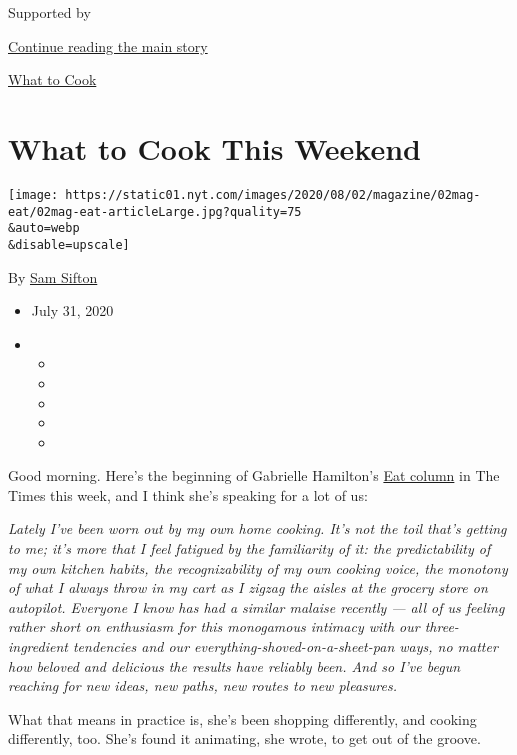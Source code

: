 Supported by

\protect\hyperlink{after-sponsor}{Continue reading the main story}

\href{/column/what-to-cook}{What to Cook}

\hypertarget{what-to-cook-this-weekend}{%
\section{What to Cook This Weekend}\label{what-to-cook-this-weekend}}

\texttt{[image: https://static01.nyt.com/images/2020/08/02/magazine/02mag-eat/02mag-eat-articleLarge.jpg?quality=75\\\&auto=webp\\\&disable=upscale]}

By \href{https://www.nytimes.com/by/sam-sifton}{Sam Sifton}

\begin{itemize}
\item
  July 31, 2020
\item
  \begin{itemize}
  \item
  \item
  \item
  \item
  \item
  \end{itemize}
\end{itemize}

Good morning. Here's the beginning of Gabrielle Hamilton's
\href{https://www.nytimes.com/2020/07/29/magazine/bored-with-your-home-cooking-some-smoky-eggplant-will-fix-that.html}{Eat
column} in The Times this week, and I think she's speaking for a lot of
us:

\emph{Lately I've been worn out by my own home cooking. It's not the
toil that's getting to me; it's more that I feel fatigued by the
familiarity of it: the predictability of my own kitchen habits, the
recognizability of my own cooking voice, the monotony of what I always
throw in my cart as I zigzag the aisles at the grocery store on
autopilot. Everyone I know has had a similar malaise recently --- all of
us feeling rather short on enthusiasm for this monogamous intimacy with
our three-ingredient tendencies and our everything-shoved-on-a-sheet-pan
ways, no matter how beloved and delicious the results have reliably
been. And so I've begun reaching for new ideas, new paths, new routes to
new pleasures.}

What that means in practice is, she's been shopping differently, and
cooking differently, too. She's found it animating, she wrote, to get
out of the groove.


